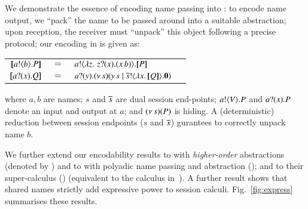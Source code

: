 We demonstrate the essence of encoding name passing into \HO: 
to encode name output, we ``pack''
the name to be passed around into a suitable abstraction; 
upon reception, the receiver must ``unpack'' this object following a precise protocol; our encoding 
in \HO is given as:
\begin{center}
\begin{tabular}{rcll}
  $[\!\![a ! \langle b \rangle . P]\!\!]$	&$=$&	$a ! \langle  \lambda z.\,\,z ? (x) . (x\, {b})  \rangle . [\!\![P]\!\!]$ \\
  $[\!\![a ? (x) . Q]\!\!]$	&$=$&	$a ? (y) . (\nu\, s)(y\, {s} \;|\; \overline{s} ! \langle \lambda x.\,[\!\![Q]\!\!] \rangle . \mathbf{0})$
\end{tabular}
\end{center}
\noi where $a,b$ are names; $s$ and $\overline{s}$ are 
dual session end-points;
$a ! \langle V \rangle . P$ and 
$a ? (x) . P$ denote an input and output at $a$;   
and $(\nu\, s)(P)$ is hiding. 
A (deterministic) reduction between session endpoints 
($s$ and $\overline{s}$) gurantees to correctly unpack name $b$.


We further extend our encodability results to 
\HOp with \emph{higher-order} abstractions (denoted by \HOpp) 
and to \HOp with polyadic name passing and abstraction (\pHOp); and to
their super-calculus  (\PHOpp) (equivalent to the calculus in~\cite{tlca07}). 
A further result shows that 
shared names
strictly add expressive power 
to session calculi. 
Fig.~\ref{fig:express} summarises %
these results. %

